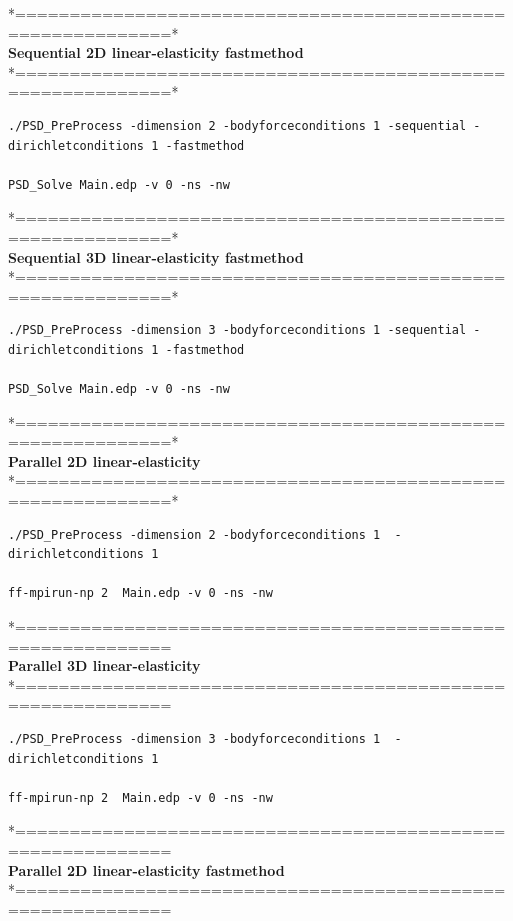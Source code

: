 \documentclass{report}
\begin{document}
*============================================================*\\
\textbf{ Sequential  2D linear-elasticity fastmethod }      \\
*============================================================*\\
\begin{lstlisting}[style=Linux] 
./PSD_PreProcess -dimension 2 -bodyforceconditions 1 -sequential -dirichletconditions 1 -fastmethod 

PSD_Solve Main.edp -v 0 -ns -nw	
\end{lstlisting}
*============================================================*\\
\textbf{ Sequential  3D linear-elasticity   fastmethod }     \\
*============================================================*\\
\begin{lstlisting}[style=Linux] 
./PSD_PreProcess -dimension 3 -bodyforceconditions 1 -sequential -dirichletconditions 1 -fastmethod 

PSD_Solve Main.edp -v 0 -ns -nw  	
\end{lstlisting}



*============================================================*\\
\textbf{ Parallel 2D linear-elasticity }                  \\
*============================================================*\\
	
\begin{lstlisting}[style=Linux]
./PSD_PreProcess -dimension 2 -bodyforceconditions 1  -dirichletconditions 1 

ff-mpirun-np 2  Main.edp -v 0 -ns -nw
\end{lstlisting}
*============================================================\\
\textbf{ Parallel 3D linear-elasticity  }                 \\
*============================================================\\
	
\begin{lstlisting}[style=Linux]
./PSD_PreProcess -dimension 3 -bodyforceconditions 1  -dirichletconditions 1 

ff-mpirun-np 2  Main.edp -v 0 -ns -nw
\end{lstlisting}
*============================================================\\
\textbf{ Parallel 2D linear-elasticity     fastmethod  }            \\
*============================================================\\
	
\end{document}
